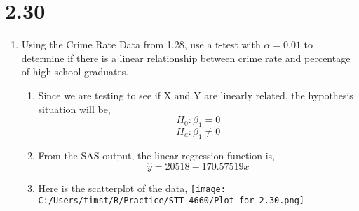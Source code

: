 \documentclass{article}
\begin{document}
\section*{2.30}
	\begin{enumerate}[label = \alph*)]
		\item Using the Crime Rate Data from 1.28, use a t-test with $\alpha = 0.01$ to determine if there is a linear relationship between crime rate and percentage of high school graduates.
		\begin{enumerate}[label = \arabic*)]
			\item Since we are testing to see if X and Y are linearly related, the hypothesis situation will be,
			\[H_0: \beta_1 = 0\]
			\[H_a: \beta_1 \neq 0\]
			\item From the SAS output, the linear regression function is,
			\[\hat{y} = 20518 - 170.57519x\]
			\item Here is the scatterplot of the data,
				\centering
				\texttt{[image: C:/Users/timst/R/Practice/STT 4660/Plot\_for\_2.30.png]}
				

\end{enumerate}
\end{enumerate}
\end{document}
